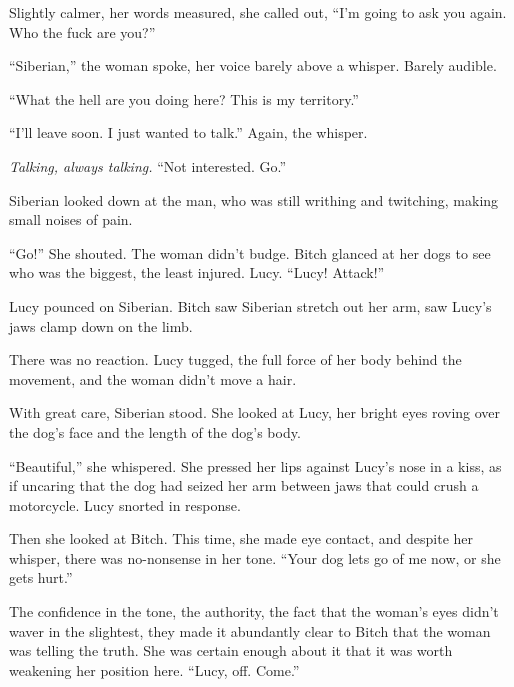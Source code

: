 Slightly calmer, her words measured, she called out, ``I'm going to ask you again.  Who the fuck are you?''



``Siberian,'' the woman spoke, her voice barely above a whisper.  Barely audible.



``What the hell are you doing here?  This is my territory.''



``I'll leave soon.  I just wanted to talk.''  Again, the whisper.



\emph{Talking, always talking.}  ``Not interested.  Go.''



Siberian looked down at the man, who was still writhing and twitching, making small noises of pain.



``Go!''  She shouted.  The woman didn't budge.  Bitch glanced at her dogs to see who was the biggest, the least injured.  Lucy.  ``Lucy!  Attack!''



Lucy pounced on Siberian.  Bitch saw Siberian stretch out her arm, saw Lucy's jaws clamp down on the limb.



There was no reaction.  Lucy tugged, the full force of her body behind the movement, and the woman didn't move a hair.



With great care, Siberian stood.  She looked at Lucy, her bright eyes roving over the dog's face and the length of the dog's body.



``Beautiful,'' she whispered.  She pressed her lips against Lucy's nose in a kiss, as if uncaring that the dog had seized her arm between jaws that could crush a motorcycle.  Lucy snorted in response.



Then she looked at Bitch.  This time, she made eye contact, and despite her whisper, there was no-nonsense in her tone.  ``Your dog lets go of me now, or she gets hurt.''



The confidence in the tone, the authority, the fact that the woman's eyes didn't waver in the slightest, they made it abundantly clear to Bitch that the woman was telling the truth.  She was certain enough about it that it was worth weakening her position here.  ``Lucy, off.  Come.''




